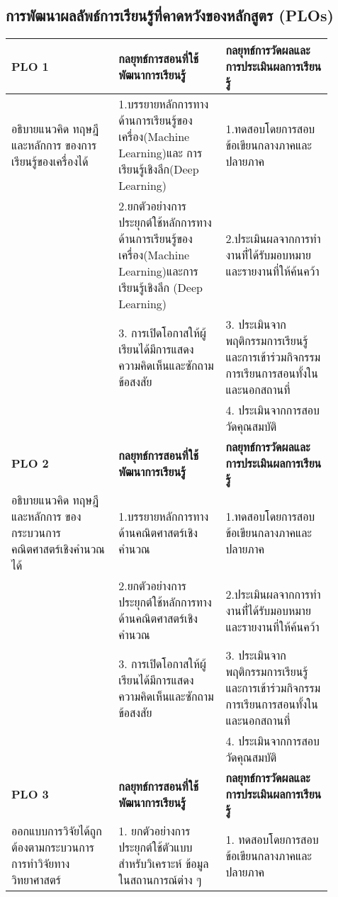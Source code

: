 \begin{landscape}
 
 \newpage
\subsection{การพัฒนาผลลัพธ์การเรียนรู้ที่คาดหวังของหลักสูตร (PLOs)}
 
 \par\noindent\bigskip
 \renewcommand{\arraystretch}{1.3}
 \begin{longtable}{|p{0.3\linewidth}|p{0.3\linewidth}|p{0.3\linewidth}|}
 \hline
 \textbf{PLO 1} & \textbf{กลยุทธ์การสอนที่ใช้พัฒนาการเรียนรู้} & \textbf{กลยุทธ์การวัดผลและการประเมินผลการเรียนรู้} \\ 
 \hline
 อธิบายแนวคิด ทฤษฎี และหลักการ ของการเรียนรู้ของเครื่องได้ & 1.บรรยายหลักการทางด้านการเรียนรู้ของเครื่อง(Machine Learning)และ การเรียนรู้เชิงลึก(Deep Learning)& 1.ทดสอบโดยการสอบข้อเขียนกลางภาคและปลายภาค \\ \hline
& 2.ยกตัวอย่างการประยุกต์ใช้หลักการทางด้านการเรียนรู้ของเครื่อง(Machine Learning)และการเรียนรู้เชิงลึก (Deep Learning)& 2.ประเมินผลจากการทำงานท่ี่ได้รับมอบหมายและรายงานที่ให้ค้นคว้า \\ \hline
& 3. การเปิดโอกาสให้ผู้เรียนได้มีการแสดงความคิดเห็นและซักถามข้อสงสัย& 3. ประเมินจากพฤติกรรมการเรียนรู้ และการเข้าร่วมกิจกรรมการเรียนการสอนทั้งในและนอกสถานที่ \\ \hline
&&4. ประเมินจากการสอบวัดคุณสมบัติ \\ \hline
 \textbf{PLO 2} & \textbf{กลยุทธ์การสอนที่ใช้พัฒนาการเรียนรู้} & \textbf{กลยุทธ์การวัดผลและการประเมินผลการเรียนรู้} \\ 
 \hline
 อธิบายแนวคิด ทฤษฎี และหลักการ ของกระบวนการคณิตศาสตร์เชิงคำนวณได้ & 1.บรรยายหลักการทางด้านคณิตศาสตร์เชิงคำนวณ& 1.ทดสอบโดยการสอบข้อเขียนกลางภาคและปลายภาค \\ \hline
 & 2.ยกตัวอย่างการประยุกต์ใช้หลักการทางด้านคณิตศาสตร์เชิงคำนวณ& 2.ประเมินผลจากการทำงานท่ี่ได้รับมอบหมายและรายงานที่ให้ค้นคว้า \\ \hline
& 3. การเปิดโอกาสให้ผู้เรียนได้มีการแสดงความคิดเห็นและซักถามข้อสงสัย& 3. ประเมินจากพฤติกรรมการเรียนรู้ และการเข้าร่วมกิจกรรมการเรียนการสอนทั้งในและนอกสถานที่ \\ \hline
&&4. ประเมินจากการสอบวัดคุณสมบัติ \\ \hline
 \textbf{PLO 3} & \textbf{กลยุทธ์การสอนที่ใช้พัฒนาการเรียนรู้} & \textbf{กลยุทธ์การวัดผลและการประเมินผลการเรียนรู้} \\ 
 \hline
 ออกแบบการวิจัยได้ถูกต้องตามกระบวนการการทำวิจัยทางวิทยาศาสตร์ & 1. ยกตัวอย่างการประยุกต์ใช้ตัวแบบสำหรับวิเคราะห์ ข้อมูลในสถานการณ์ต่าง ๆ & 1. ทดสอบโดยการสอบข้อเขียนกลางภาคและปลายภาค \\

\end{longtable}
\end{landscape}
